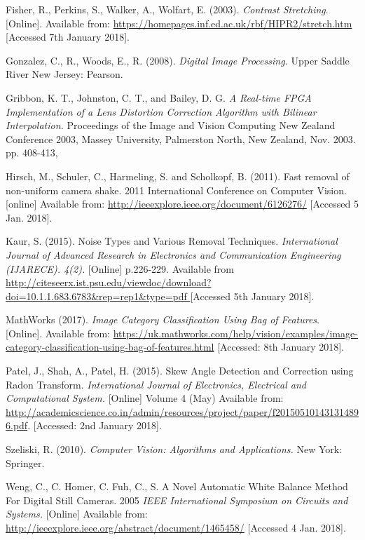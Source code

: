 \documentclass[a4paper, 12pt]{article}
\begin{document}
Fisher, R., Perkins, S., Walker, A., Wolfart, E. (2003). \textit{Contrast Stretching}. [Online]. Available from: \url{https://homepages.inf.ed.ac.uk/rbf/HIPR2/stretch.htm} [Accessed 7th January 2018].

Gonzalez, C., R., Woods, E., R. (2008). \textit{Digital Image Processing.} Upper Saddle River New Jersey: Pearson.

Gribbon, K. T., Johnston, C. T., and Bailey, D.
G. \textit{A Real-time FPGA Implementation of a
Lens Distortion Correction Algorithm with
Bilinear Interpolation.} Proceedings of the
Image and Vision Computing New Zealand
Conference 2003, Massey University,
Palmerston North, New Zealand, Nov. 2003. pp. 408-413,

Hirsch, M., Schuler, C., Harmeling, S. and Scholkopf, B. (2011). Fast removal of non-uniform camera shake. 2011 International Conference on Computer Vision. [online] Available from: \url{http://ieeexplore.ieee.org/document/6126276/} [Accessed 5 Jan. 2018].

Kaur, S. (2015). Noise Types and Various Removal Techniques. \textit{International Journal of Advanced Research in Electronics and Communication Engineering (IJARECE). 4(2).} [Online] p.226-229. Available from \url{http://citeseerx.ist.psu.edu/viewdoc/download?doi=10.1.1.683.6783&rep=rep1&type=pdf
} [Accessed 5th January 2018].

MathWorks (2017). \textit{Image Category Classification Using Bag of Features}. [Online]. Available from: \url{https://uk.mathworks.com/help/vision/examples/image-category-classification-using-bag-of-features.html} [Accessed: 8th January 2018].

Patel, J., Shah, A., Patel, H. (2015). Skew Angle Detection and Correction using Radon Transform. \textit{International Journal of Electronics, Electrical and Computational System.} [Online] Volume 4 (May) Available from: \url{http://academicscience.co.in/admin/resources/project/paper/f201505101431314896.pdf}. [Accessed: 2nd January 2018].

Szeliski, R. (2010). \textit{Computer Vision: Algorithms and Applications.} New York: Springer.

Weng, C., C. Homer, C. Fuh, C., S. A Novel Automatic White Balance Method For Digital Still Cameras. 2005 \textit{IEEE International Symposium on Circuits and Systems.} [Online] Available from: \url{http://ieeexplore.ieee.org/abstract/document/1465458/} [Accessed 4 Jan. 2018].
\end{document}
